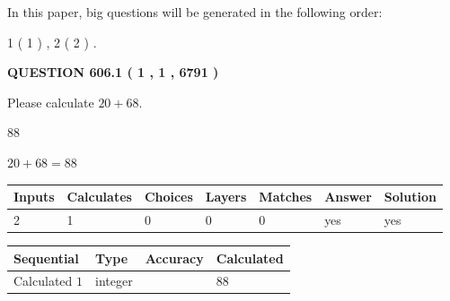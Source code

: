 \documentclass[12pt]{article}
\begin{document}
In this paper, big questions will be generated in the following order: 
   
   
   1 ( 1 )
 ,
   2 ( 2 )
 .
  
\vspace{0.2in}
  
{\textbf{\Large{QUESTION
606.1 
 ( 1 , 1 , 6791 )
}}}
  
  
 
Please calculate $ %
20 +  %
68 $.
 
 
 
\noindent{}
 
 

88
 
 
\noindent{}
 
 

 
 
 
\noindent{}
 
 

$ %
20 +  %
68=   %
88$
 
 
\noindent{}
 
 

 
   
   
   
   
\noindent\begin{tabular}{|l|l|l|l|l|l|l|}
 \hline
Inputs & Calculates & Choices & Layers & Matches & Answer & Solution \\ \hline
 2  & 
 1  & 
 0
  & 
 0  & 
 0  & 
  yes & 
  yes 
  \\ \hline
 \end{tabular}
   
   
   
   
\noindent{}
   
   
  
  
\noindent\begin{tabular}{|l|l|l|l|}
\hline
 Sequential & Type & Accuracy & Calculated \\ 
\hline
 
 
  Calculated $  1 $ & integer &  & 
  $ 88 $ 
 \\  \hline  
 \end{tabular}
   
\end{document}
